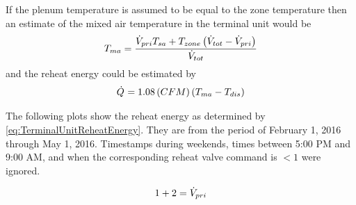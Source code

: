 If the plenum temperature is assumed to be equal to the zone temperature
then an estimate of the mixed air temperature in the terminal unit would
be
\begin{equation}
    T_{ma} = \frac{\dot{V}_{pri} T_{sa} + T_{zone} \left( \dot{V}_{tot} - \dot{V}_{pri} \right) }{ \dot{V}_{tot}}
    \label{eq:TerminalUnitMixedAirTemp}
\end{equation}
and the reheat energy could be estimated by
\begin{equation}
    \dot{Q}_{} = 1.08 \left( CFM \right) \left( T_{ma} - T_{dis}  \right)
    \label{eq:TerminalUnitReheatEnergy}
\end{equation}

The following plots show the reheat energy as determined by 
\ref{eq:TerminalUnitReheatEnergy}. They are from the period of February
1, 2016 through May 1, 2016.  Timestamps during weekends, times between
5:00 PM and 9:00 AM, and when the corresponding reheat valve command is
\( < 1 \) were ignored.

\begin{equation}
    1+2 = \dot{V}_{pri}
    \label{eq:fakelabel}
\end{equation}



